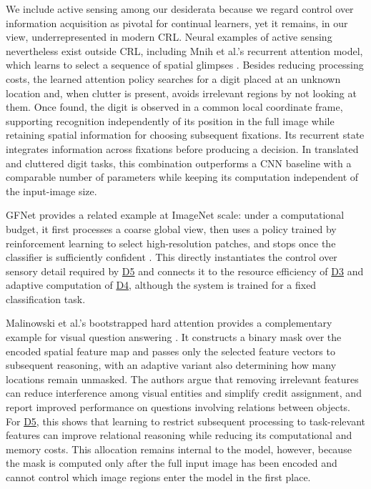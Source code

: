 \documentclass[10pt,journal,compsoc]{IEEEtran}
\DeclareRobustCommand{\Dref}[1]{\hyperref[sec:d#1]{D#1}}
\begin{document}
We include active sensing among our desiderata because we regard control over information acquisition as pivotal for continual learners, yet it remains, in our view, underrepresented in modern CRL.
Neural examples of active sensing nevertheless exist outside CRL, including Mnih et al.'s recurrent attention model, which learns to select a sequence of spatial glimpses \cite{mnih2014}.
Besides reducing processing costs, the learned attention policy searches for a digit placed at an unknown location and, when clutter is present, avoids irrelevant regions by not looking at them.
Once found, the digit is observed in a common local coordinate frame, supporting recognition independently of its position in the full image while retaining spatial information for choosing subsequent fixations.
Its recurrent state integrates information across fixations before producing a decision.
In translated and cluttered digit tasks, this combination outperforms a CNN baseline with a comparable number of parameters while keeping its computation independent of the input-image size.

GFNet provides a related example at ImageNet scale: under a computational budget, it first processes a coarse global view, then uses a policy trained by reinforcement learning to select high-resolution patches, and stops once the classifier is sufficiently confident \cite{wang2020}.
This directly instantiates the control over sensory detail required by \Dref{5} and connects it to the resource efficiency of \Dref{3} and adaptive computation of \Dref{4}, although the system is trained for a fixed classification task.

Malinowski et al.'s bootstrapped hard attention provides a complementary example for visual question answering \cite{malinowski2018}.
It constructs a binary mask over the encoded spatial feature map and passes only the selected feature vectors to subsequent reasoning, with an adaptive variant also determining how many locations remain unmasked.
The authors argue that removing irrelevant features can reduce interference among visual entities and simplify credit assignment, and report improved performance on questions involving relations between objects.
For \Dref{5}, this shows that learning to restrict subsequent processing to task-relevant features can improve relational reasoning while reducing its computational and memory costs.
This allocation remains internal to the model, however, because the mask is computed only after the full input image has been encoded and cannot control which image regions enter the model in the first place.
\end{document}
